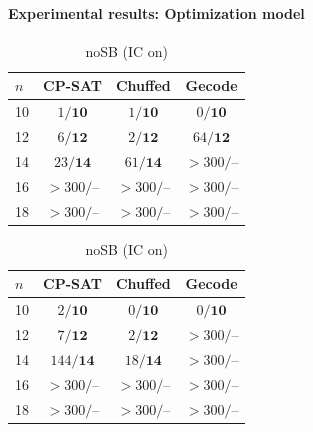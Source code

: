 \documentclass{article}
\begin{document}
\paragraph{Experimental results: Optimization model}
\mbox{}\par\vspace{0.5em}
\begin{table}[H]\centering\small
\begin{minipage}{.48\textwidth}\centering
\begin{tabular}{l|ccc}\toprule
$n$ & CP-SAT & Chuffed & Gecode\\\midrule
10 & $1/\mathbf{10}$ & $1/\mathbf{10}$ & $0/\mathbf{10}$\\
12 & $6/\mathbf{12}$ & $2/\mathbf{12}$ & $64/\mathbf{12}$\\
14 & $23/\mathbf{14}$ & $61/\mathbf{14}$ & \(>300/\text{--}\)\\
16 & \(>300/\text{--}\) & \(>300/\text{--}\) & \(>300/\text{--}\)\\
18 & \(>300/\text{--}\) & \(>300/\text{--}\) & \(>300/\text{--}\)\\\bottomrule
\end{tabular}
\caption{Baseline (SB+IC)}
\end{minipage}\hfill
\begin{minipage}{.48\textwidth}\centering
\begin{tabular}{l|ccc}\toprule
$n$ & CP-SAT & Chuffed & Gecode\\\midrule
10 & $2/\mathbf{10}$ & $0/\mathbf{10}$ & $0/\mathbf{10}$\\
12 & $7/\mathbf{12}$ & $2/\mathbf{12}$ & \(>300/\text{--}\)\\
14 & $144/\mathbf{14}$ & $18/\mathbf{14}$ & \(>300/\text{--}\)\\
16 & \(>300/\text{--}\) & \(>300/\text{--}\) & \(>300/\text{--}\)\\
18 & \(>300/\text{--}\) & \(>300/\text{--}\) & \(>300/\text{--}\)\\\bottomrule
\end{tabular}
\caption{noSB (IC on)}
\end{minipage}
\end{table}
\end{document}
